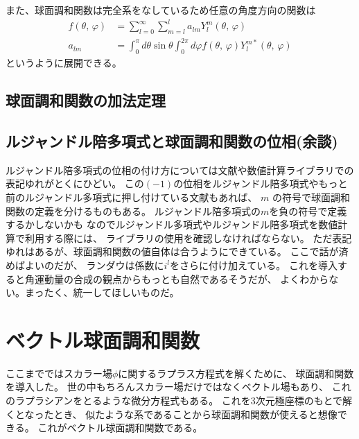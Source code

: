 \documentclass[../../master.tex]{subfiles}
\begin{document}
また、球面調和関数は完全系をなしているため任意の角度方向の関数は
\begin{align}
	f(\theta,\,\varphi) &= \sum_{l=0}^{\infty}\sum_{m=l}^{l} a_{lm}Y_l^m(\theta,\,\varphi)\\
	a_{lm} &=\int_{0}^{\pi} d\theta\sin\theta\int_{0}^{2\pi}d\varphi f(\theta,\,\varphi)Y_l^{m*}(\theta,\,\varphi)
\end{align}
というように展開できる。

\subsection{球面調和関数の加法定理}

\subsection{ルジャンドル陪多項式と球面調和関数の位相(余談)}

ルジャンドル陪多項式の位相の付け方については文献や数値計算ライブラリでの表記ゆれがとくにひどい。
この\((-1)\)の位相をルジャンドル陪多項式やもっと前のルジャンドル多項式に押し付けている文献もあれば、
\(m\) の符号で球面調和関数の定義を分けるものもある。
ルジャンドル陪多項式の\(m\)を負の符号で定義するかしないかも
なのでルジャンドル多項式やルジャンドル陪多項式を数値計算で利用する際には、
ライブラリの使用を確認しなければならない。
ただ表記ゆれはあるが、球面調和関数の値自体は合うようにできている。
ここで話が済めばよいのだが、
ランダウは係数に\(i^l\)をさらに付け加えている。
これを導入すると角運動量の合成の観点からもっとも自然であるそうだが、
よくわからない。まったく、統一してほしいものだ。

\section{ベクトル球面調和関数}
ここまでではスカラー場\(\phi\)に関するラプラス方程式を解くために、
球面調和関数を導入した。
世の中もちろんスカラー場だけではなくベクトル場もあり、
これのラプラシアンをとるような微分方程式もある。
これを3次元極座標のもとで解くとなったとき、
似たような系であることから球面調和関数が使えると想像できる。
これがベクトル球面調和関数である。
\end{document}
